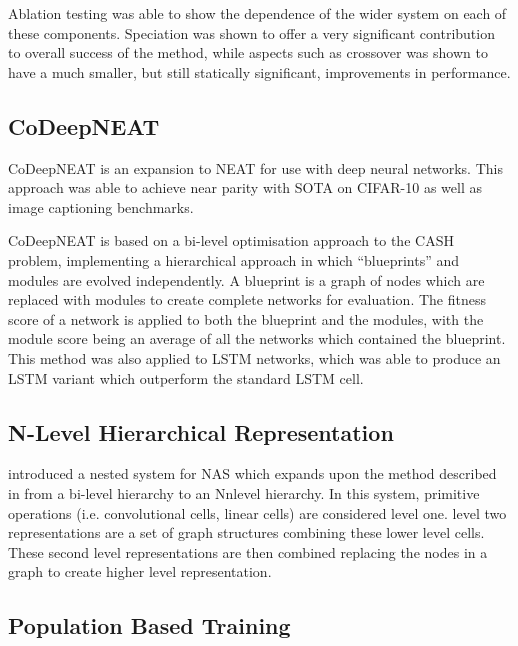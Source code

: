 \documentclass{article}
\begin{document}
Ablation testing was able to show the dependence of the wider system on each of these components. Speciation was shown to offer a very significant contribution to overall success of the method, while aspects such as crossover was shown to have a much smaller, but still statically significant, improvements in performance.


\subsection{CoDeepNEAT}

CoDeepNEAT \cite{25} is an expansion to NEAT for use with deep neural networks. This approach was able to achieve near parity with SOTA on CIFAR-10 as well as image captioning benchmarks. 

\par
CoDeepNEAT is based on a bi-level optimisation approach to the CASH problem, implementing a hierarchical approach in which “blueprints” and modules are evolved independently. A blueprint is a graph of nodes which are replaced with modules to create complete networks for evaluation. The fitness score of a network is applied to both the blueprint and the modules, with the module score being an average of all the networks which contained the blueprint. This method was also applied to LSTM networks, which was able to produce an LSTM variant which outperform the standard LSTM cell.

\subsection{N-Level Hierarchical Representation }

\cite{4} introduced a nested system for NAS which expands upon the method described in \cite{25} from a bi-level hierarchy to an Nnlevel hierarchy. In this system, primitive operations (i.e. convolutional cells, linear cells) are considered level one. level two representations are a set of graph structures combining these lower level cells. These second level representations are then combined replacing the nodes in a graph to create higher level representation. 

\subsection{Population Based Training}
\end{document}
